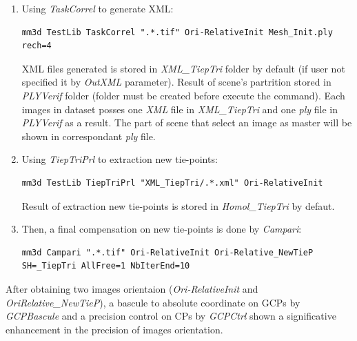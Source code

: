 \begin{enumerate}
\item Using \textit{TaskCorrel} to generate XML: 
\begin{verbatim}
mm3d TestLib TaskCorrel ".*.tif" Ori-RelativeInit Mesh_Init.ply rech=4
\end{verbatim}



XML files generated is stored in \textit{XML\_TiepTri} folder by default (if user not specified it by \textit{OutXML} parameter). 
Result of scene's partrition stored in \textit{PLYVerif} folder (folder must be created before execute the command). 
Each images in dataset posses one \textit{XML} file in \textit{XML\_TiepTri} and one \textit{ply} file in \textit{PLYVerif} as a result. 
The part of scene that select an image as master will be shown in correspondant \textit{ply} file.

\item Using \textit{TiepTriPrl} to extraction new tie-points: 
\begin{verbatim}
mm3d TestLib TiepTriPrl "XML_TiepTri/.*.xml" Ori-RelativeInit
\end{verbatim}
Result of extraction new tie-points is stored in \textit{Homol\_TiepTri} by defaut.


\item Then, a final compensation on new tie-points is done by \textit{Campari}:
\begin{verbatim}
mm3d Campari ".*.tif" Ori-RelativeInit Ori-Relative_NewTieP SH=_TiepTri AllFree=1 NbIterEnd=10
\end{verbatim}
\end{enumerate}

After obtaining two images orientaion (\textit{Ori-RelativeInit} and \textit{Ori\-Relative\_NewTieP}), a bascule to absolute coordinate on GCPs by \textit{GCPBascule} and a precision control on CPs by \textit{GCPCtrl} shown a significative enhancement in the precision of images orientation.





